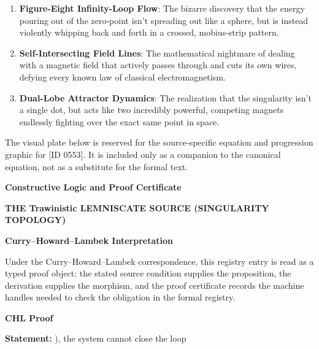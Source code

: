 \begin{enumerate}[leftmargin=1.6em,itemsep=6pt,topsep=4pt]
\item \textbf{Figure-Eight Infinity-Loop Flow}: The bizarre discovery that the energy pouring out of the zero-point isn't spreading out like a sphere, but is instead violently whipping back and forth in a crossed, mobius-strip pattern.
\item \textbf{Self-Intersecting Field Lines}: The mathematical nightmare of dealing with a magnetic field that actively passes through and cuts its own wires, defying every known law of classical electromagnetism.
\item \textbf{Dual-Lobe Attractor Dynamics}: The realization that the singularity isn't a single dot, but acts like two incredibly powerful, competing magnets endlessly fighting over the exact same point in space.
\end{enumerate}

\begingroup\footnotesize\sloppy
The visual plate below is reserved for the source-specific equation and progression graphic for [ID 0553]. It is included only as a companion to the canonical equation, not as a substitute for the formal text.
\par\endgroup
\ifTZPDarkEdition
{}
\fi

\clearpage
\begingroup\tzpsupportsetup
\noindent\textbf{\fontsize{10.8pt}{12.8pt}\selectfont [ID 0553] Constructive Logic and Proof Certificate}\par
\noindent\textbf{\fontsize{10pt}{12pt}\selectfont THE Trawinistic LEMNISCATE SOURCE (SINGULARITY TOPOLOGY)}\par
\vspace{0.45em}
\begingroup
\footnotesize
\setlength{\parskip}{0.22em}
\setlength{\parindent}{0pt}
\noindent\textbf{Curry--Howard--Lambek Interpretation}\par
Under the Curry--Howard--Lambek correspondence, this registry entry is read as a typed proof
object: the stated source condition supplies the proposition, the derivation supplies the
morphism, and the proof certificate records the machine handles needed to check the obligation
in the formal registry.

\vspace{0.45em}
\noindent\textbf{CHL Proof}\par
\textbf{Statement:} ), the system cannot close the loop

